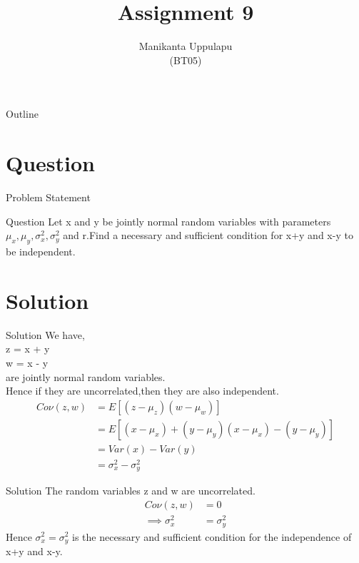 \documentclass{beamer}
\title{Assignment 9}
\author{Manikanta Uppulapu \\ (BT05)}
\date{}
\begin{document}
\begin{frame}
 \titlepage
\end{frame}

\begin{frame}{Outline}
 \tableofcontents
\end{frame}
	
\section{Question}
\begin{frame}{Problem Statement}
\begin{block}{Question}
Let x and y be jointly normal random variables with parameters $\mu_x,\mu_y,\sigma_x^2,\sigma_y^2$ and r.Find a necessary and sufficient condition for x+y and x-y to be independent.\\
\end{block}
\end{frame}

\section{Solution}
\begin{frame}{Solution}
We have,\\
	   z = x + y\\
	   w = x - y\\
	   are jointly normal random variables.\\
Hence if they are uncorrelated,then they are also independent.\\
\begin{align}
Co\nu(z,w) &= E[(z-\mu_z)(w-\mu_w)]\\
	  &= E[{(x-\mu_x)+(y-\mu_y)}{(x-\mu_x)-(y-\mu_y)}]\\
	  &= Var(x)-Var(y)\\
	  &= \sigma_x^2 - \sigma_y^2
\end{align}
\end{frame}

\begin{frame}{Solution}
The random variables z and w are uncorrelated.
 \begin{align}
 Co\nu(z,w) &= 0\\
 \implies \sigma_x^2 &= \sigma_y^2
\end{align}
Hence $\sigma_x^2 = \sigma_y^2$ is the necessary and sufficient condition for the independence of x+y and x-y.\\
\end{frame}
	
\end{document}
